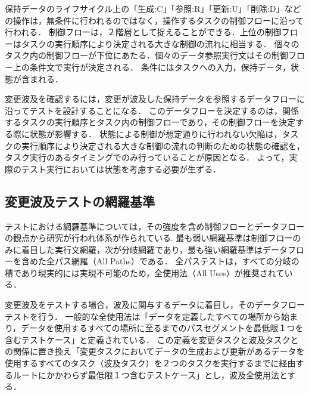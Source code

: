 \documentclass[a4paper,12pt]{jreport}
\begin{document}
保持データのライフサイクル上の「生成:C」「参照:R」「更新:U」「削除:D」などの操作は，無条件に行われるのではなく，操作するタスクの制御フローに沿って行われる．
制御フローは，２階層として捉えることができる．上位の制御フローはタスクの実行順序により決定される大きな制御の流れに相当する．
個々のタスク内の制御フローが下位にあたる．個々のデータ参照実行文はその制御フロー上の条件文で実行が決定される．
条件にはタスクへの入力，保持データ，状態が含まれる．

変更波及を確認するには，変更が波及した保持データを参照するデータフローに沿ってテストを設計することになる．
このデータフローを決定するのは，関係するタスクの実行順序とタスク内の制御フローであり，その制御フローを決定する際に状態が影響する．
状態による制御が想定通りに行われない欠陥は，タスクの実行順序により決定される大きな制御の流れの判断のための状態の確認を，タスク実行のあるタイミングでのみ行っていることが原因となる．%
よって，実際のテスト実行においては状態を考慮する必要が生ずる．

\subsection{変更波及テストの網羅基準}

テストにおける網羅基準については，その強度を含め制御フローとデータフローの観点から研究が行われ体系が作られている\cite{beiz90}.
最も弱い網羅基準は制御フローのみに着目した実行文網羅，次が分岐網羅であり，最も強い網羅基準はデータフローを含めた全パス網羅（All Paths）である．%
全パステストは，すべての分岐の積であり現実的には実現不可能のため，全使用法（All Uses）が推奨されている\cite{beiz90}．

変更波及をテストする場合，波及に関与するデータに着目し，そのデータフローテストを行う．
一般的な全使用法は「データを定義したすべての場所から始まり，データを使用するすべての場所に至るまでのパスセグメントを最低限１つを含むテストケース」と定義されている\cite{beiz90}．
この定義を変更タスクと波及タスクとの関係に置き換え「変更タスクにおいてデータの生成および更新があるデータを使用するすべてのタスク（波及タスク）を２つのタスクを実行するまでに経由するルートにかかわらず最低限１つ含むテストケース」とし，波及全使用法とする．


% 
  
  
%


\end{document}
